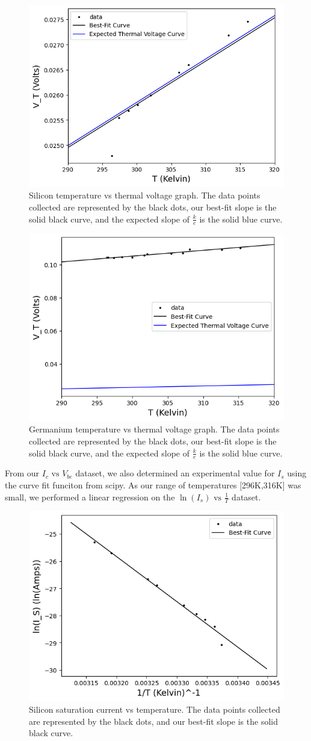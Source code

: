 \documentclass[12pt,letterpaper,twocolumn]{article}
\begin{document}
\begin{figure}[h]
	\includegraphics[width = .5\textwidth]{2_6SiBoltz.png}
	\caption{Silicon temperature vs thermal voltage graph. The data points collected are represented by the black dots, our best-fit slope is the solid black curve, and the expected slope of $\frac{k}{e}$ is the solid blue curve.\label{g1}}
\end{figure}
\begin{figure}[h]
	\includegraphics[width = .5\textwidth]{GeBoltz.png}
	\caption{Germanium temperature vs thermal voltage graph. The data points collected are represented by the black dots, our best-fit slope is the solid black curve, and the expected slope of $\frac{k}{e}$ is the solid blue curve.\label{g2}}
\end{figure}
From our $I_c \text{ vs } V_{be}$ dataset, we also determined an experimental value for $I_s$ using the curve fit funciton from scipy.
As our range of temperatures [296K,316K] was small, we performed a linear regression on the $\ln(I_s) \text{ vs }\frac{1}{T}$ dataset.
\begin{figure}[h]
	\includegraphics[width = .5\textwidth]{linSiSatCurrent.png}
	\caption{Silicon saturation current vs temperature. The data points collected are represented by the black dots, and our best-fit slope is the solid black curve.\label{g3}}
\end{figure}
\end{document}
